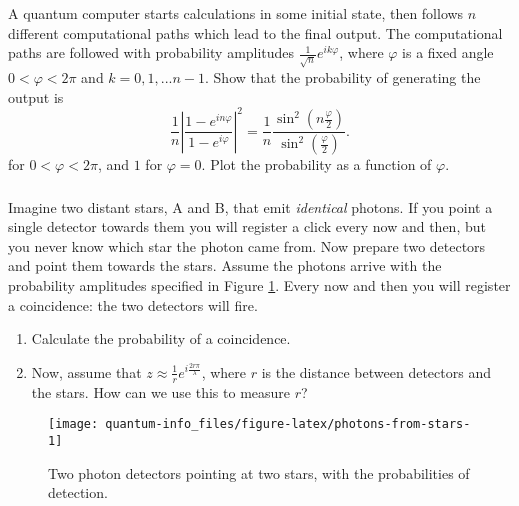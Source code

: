 \documentclass[fleqn]{article}
\providecommand{\tightlist}{%
  \setlength{\itemsep}{0pt}\setlength{\parskip}{0pt}}
\renewcommand{\footnote}[1]{\en{#1}}
\begin{document}
\hypertarget{section-3}{%
\subsubsection{}\label{section-3}}

A quantum computer starts calculations in some initial state, then follows \(n\) different computational paths which lead to the final output.
The computational paths are followed with probability amplitudes \(\frac{1}{\sqrt n}e^{i k \varphi}\), where \(\varphi\) is a fixed angle \(0< \varphi <2\pi\) and \(k=0,1,...n-1\).
Show that the probability of generating the output is\footnote{\(1+z+z^2+\ldots + z^n= \frac{1-z^{n+1}}{1-z}\)}
\[
  \frac{1}{n}\left\vert
    \frac{1-e^{i n\varphi}}{1-e^{i\varphi}}
  \right\vert^2
  = \frac{1}{n} \frac{\sin^2 (n\frac{\varphi}{2})}{\sin^2 (\frac{\varphi}{2})}.
\]
for \(0<\varphi<2\pi\), and \(1\) for \(\varphi=0\).
Plot the probability as a function of \(\varphi\).

\hypertarget{section-4}{%
\subsubsection{}\label{section-4}}

Imagine two distant stars, A and B, that emit \emph{identical} photons.
If you point a single detector towards them you will register a click every now and then, but you never know which star the photon came from.
Now prepare two detectors and point them towards the stars.
Assume the photons arrive with the probability amplitudes specified in Figure \ref{fig:photons-from-stars}.
Every now and then you will register a coincidence: the two detectors will fire.

\begin{enumerate}
\def\labelenumi{\alph{enumi}.}
\tightlist
\item
  Calculate the probability of a coincidence.
\item
  Now, assume that \(z\approx \frac{1}{r}e^{i\frac{2r\pi}{\lambda}}\), where \(r\) is the distance between detectors and the stars. How can we use this to measure \(r\)?
\end{enumerate}

\begin{figure}[H]

{\centering \texttt{[image: quantum-info\_files/figure-latex/photons-from-stars-1]} 

}

\caption{Two photon detectors pointing at two stars, with the probabilities of detection.}\label{fig:photons-from-stars}
\end{figure}
\end{document}
